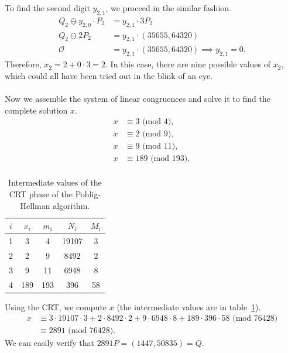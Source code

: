 \documentclass[thesis=M,english]{FITthesis}[2012/10/20]
\theoremstyle{remark}
\theoremstyle{definition}
\begin{document}
To find the second digit $y_{2,1}$, we proceed in the similar fashion.
\begin{align*}
Q_2 \ominus y_{2,0}\cdot P_2 &= y_{2,1}\cdot 3P_2 \\
Q_2 \ominus 2P_2 &= y_{2,1}\cdot (35655, 64320) \\
\mathcal{O} &= y_{2,1}\cdot (35655, 64320) \implies y_{2,1} = 0.
\end{align*}
Therefore, $x_2 = 2 + 0\cdot 3 = 2$. In this case, there are nine possible values of $x_2$, which could all have been tried out in the blink of an eye. \\\\
\noindent Now we assemble the system of linear congruences and solve it to find the complete solution $x$.
\begin{align*}
x &\equiv 3 \text{ (mod $4$)}, \\
x &\equiv 2 \text{ (mod $9$)}, \\
x &\equiv 9 \text{ (mod $11$)}, \\
x &\equiv 189 \text{ (mod $193$)}, \\
\end{align*}
\begin{table}[!h]
\centering
\begin{tabular}{ |c||c|c|c|c| } 
\hline
 $i$ & $x_i$ & $m_i$ & $N_i$ & $M_i$ \\
\hline
\hline
1 & 3 & 4 & 19107 &  3 \\ \hline
2 & 2 & 9 & 8492 & 2\\ \hline \hline
3 & 9 & 11 & 6948 & 8 \\ \hline
4 & 189 &193 & 396 & 58 \\ \hline
\end{tabular}
\caption[CRT phase of the Pohlig-Hellman algorithm]{Intermediate values of the CRT phase of the Pohlig-Hellman algorithm.}
\label{tblPH3}
\end{table}
\noindent Using the CRT, we compute $x$ (the intermediate values are in table~\ref{tblPH3}).
\begin{align*}
x &\equiv 3\cdot 19107 \cdot 3 + 2\cdot 8492 \cdot 2 +  9\cdot 6948 \cdot 8 +  189\cdot 396 \cdot 58 \text{ (mod  76428)}\\
 &\equiv 2891\text{ (mod  76428)}.
\end{align*}
We can easily verify that $2891P = (1447, 50835) = Q.$
\end{document}
